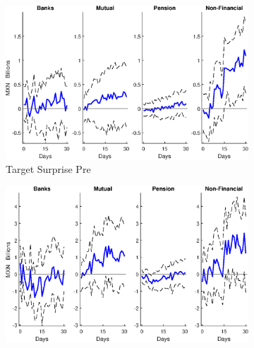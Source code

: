 \documentclass[a4paper, 12pt]{article}
\begin{document}
\begin{appendices}
	\begin{landscape}
		\begin{figure}[tbph]
			\caption{Cetes Flow Response to Target and Path Surprises by Type of Domestic Investor} \label{fig:LPCetesCateg2sb}
			\begin{center}
				\begin{minipage}{\linewidth}
					\begin{center}
						\begin{subfigure}[b]{0.475\textwidth}
							\centering
							\includegraphics[height=0.35\textheight,width=\textwidth]{../Figures/Target11CetesCateg2pre.eps}
							\caption[]{{\small Target Surprise Pre}} \label{subfig:Target11CetesCateg2pre}
						\end{subfigure}
						\hfill
						\begin{subfigure}[b]{0.475\textwidth}  
							\centering 
							\includegraphics[height=0.35\textheight,width=\textwidth]{../Figures/Path11CetesCateg2pre.eps}

\end{subfigure}
\end{center}
\end{minipage}
\end{center}
\end{figure}
\end{landscape}
\end{appendices}
\end{document}
